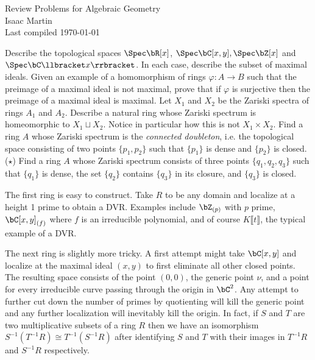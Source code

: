 


\pagestyle{empty}
	\LARGE
\begin{center}
	Review Problems for Algebraic Geometry\\
	\Large
	Isaac Martin \\
    Last compiled \today
\end{center}
\normalsize
\vspace{-2mm}
\hru
{}
\begin{homework}[e]
	\prob Describe the topological spaces $\Spec \bR[x]$, $\Spec \bC[x,y], \Spec\bZ[x]$ and $\Spec \bC\llbracket x\rrbracket$. In each case, describe the subset of maximal ideals.
	\prob Given an example of a homomorphism of rings $\varphi: A\to B$ such that the preimage of a maximal ideal is not maximal, prove that if $\varphi$ is surjective then the preimage of a maximal ideal is maximal.
	\prob Let $X_1$ and $X_2$ be the Zariski spectra of rings $A_1$ and $A_2$. Describe a natural ring whose Zariski spectrum is homeomorphic to $X_1 \sqcup X_2$. Notice in particular how this is not $X_1\times X_2$.
	\prob Find a ring $A$ whose Zariski spectrum is the \textit{connected doubleton}, i.e. the topological space consisting of two points $\{p_1,p_2\}$ such that $\{p_1\}$ is dense and $\{p_2\}$ is closed. ($\star$) Find a ring $A$ whose Zariski spectrum consists of three points $\{q_1,q_2,q_3\}$ such that $\{q_1\}$ is dense, the set $\{q_2\}$ contains $\{q_3\}$ in its closure, and $\{q_3\}$ is closed.
	\begin{prf}
		The first ring is easy to construct. Take $R$ to be any domain and localize at a height 1 prime to obtain a DVR. Examples include $\bZ_{(p)}$ with $p$ prime, $\bC[x,y]_{(f)}$ where $f$ is an irreducible polynomial, and of course $K\llbracket t\rrbracket$, the typical example of a DVR.

		The next ring is slightly more tricky. A first attempt might take $\bC[x,y]$ and localize at the maximal ideal $(x,y)$ to first eliminate all other closed points. The resulting space consists of the point $(0,0)$, the generic point $\nu$, and a point for every irreducible curve passing through the origin in $\bC^2$. Any attempt to further cut down the number of primes by quotienting will kill the generic point and any further localization will inevitably kill the origin. In fact, if $S$ and $T$ are two multiplicative subsets of a ring $R$ then we have an isomorphism $S^{-1}(T^{-1}R) \cong T^{-1}(S^{-1}R)$ after identifying $S$ and $T$ with their images in $T^{-1}R$ and $S^{-1}R$ respectively.


\end{prf}
\end{homework}

